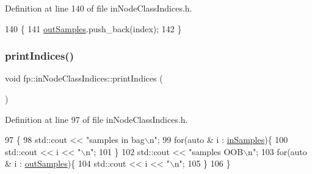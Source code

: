 Definition at line 140 of file in\+Node\+Class\+Indices.\+h.


\begin{DoxyCode}
140                                                        \{
141                 \hyperlink{classfp_1_1inNodeClassIndices_afaa76dfa346ba9de197b1cbd7a1557f9}{outSamples}.push\_back(index);
142             \}
\end{DoxyCode}
\mbox{\label{classfp_1_1inNodeClassIndices_a152ae5e3f46bad404f5e126db9d4f816}} 
\subsubsection{\texorpdfstring{print\+Indices()}{printIndices()}}
{\footnotesize\ttfamily void fp\+::in\+Node\+Class\+Indices\+::print\+Indices (\begin{DoxyParamCaption}{ }\end{DoxyParamCaption})\hspace{0.3cm}{\ttfamily [inline]}}



Definition at line 97 of file in\+Node\+Class\+Indices.\+h.


\begin{DoxyCode}
97                                \{
98                 std::cout << \textcolor{stringliteral}{"samples in bag\(\backslash\)n"};
99                 \textcolor{keywordflow}{for}(\textcolor{keyword}{auto} & i : \hyperlink{classfp_1_1inNodeClassIndices_ae830eec1ee5490f4fe4fb3d579ac78eb}{inSamples})\{
100                     std::cout << i << \textcolor{stringliteral}{"\(\backslash\)n"};
101                 \}
102                 std::cout << \textcolor{stringliteral}{"samples OOB\(\backslash\)n"};
103                 \textcolor{keywordflow}{for}(\textcolor{keyword}{auto} & i : \hyperlink{classfp_1_1inNodeClassIndices_afaa76dfa346ba9de197b1cbd7a1557f9}{outSamples})\{
104                     std::cout << i << \textcolor{stringliteral}{"\(\backslash\)n"};
105                 \}
106             \}
\end{DoxyCode}
\mbox{\label{classfp_1_1inNodeClassIndices_a8a6d33c7a2c2d24d8cf53493aded4541}} 
